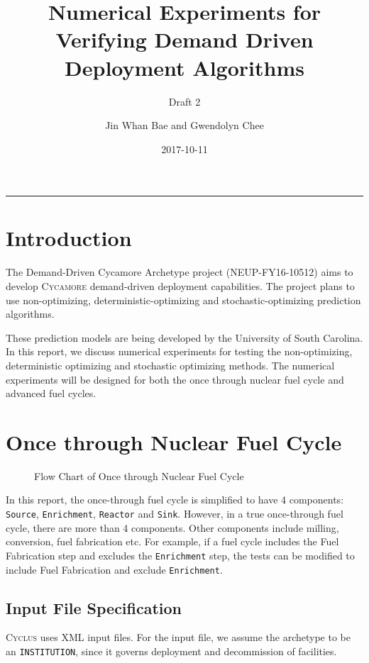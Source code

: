 \documentclass[12pt,letterpaper]{article}
\title{Numerical Experiments for Verifying Demand Driven Deployment Algorithms}
\subtitle{Draft 2}
\author{Jin Whan Bae and Gwendolyn Chee}
\date{2017-10-11}
\newcommand{\Cyclus}{\textsc{Cyclus}\xspace}%
\newcommand{\Cycamore}{\textsc{Cycamore}\xspace}%
\begin{document}
	
	\maketitle
	\hrule
	\onehalfspacing
	\thispagestyle{empty}

\section{Introduction}
The Demand-Driven Cycamore Archetype project (NEUP-FY16-10512) aims to develop \Cycamore demand-driven deployment capabilities.
The project plans to use non-optimizing, deterministic-optimizing and stochastic-optimizing prediction algorithms.

These prediction models are being developed by the University of South Carolina. In this report, we discuss numerical experiments for testing the non-optimizing, deterministic optimizing and stochastic optimizing methods. The numerical experiments will be designed for both the once through nuclear fuel cycle and advanced fuel cycles. 

\section{Once through Nuclear Fuel Cycle}
\begin{figure}[H]
\caption{Flow Chart of Once through Nuclear Fuel Cycle}
\end{figure}

In this report, the once-through fuel cycle is simplified to have 4 components: \texttt{Source}, \texttt{Enrichment}, \texttt{Reactor} and \texttt{Sink}. However, in a true once-through fuel cycle, there are more than 4 components. Other components include milling, conversion, fuel fabrication etc. For example, if a fuel cycle includes the Fuel Fabrication step and excludes the \texttt{Enrichment} step, the tests can be modified to include Fuel Fabrication and exclude \texttt{Enrichment}. 

\subsection{Input File Specification}
\Cyclus uses XML input files. For the input file, we assume the archetype to be an \texttt{INSTITUTION}, since it governs deployment and decommission of facilities.
\end{document}
